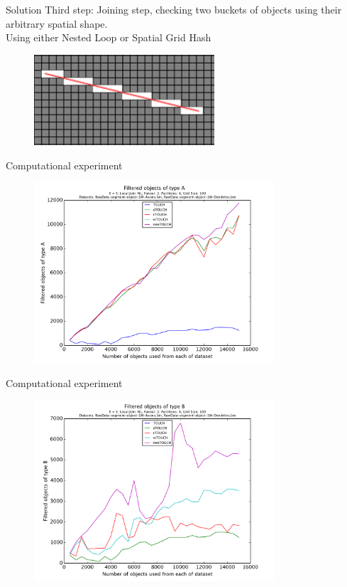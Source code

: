 \documentclass{beamer}
\begin{document}
\begin{frame}{Solution}
Third step: Joining step, checking two buckets of objects using their arbitrary spatial shape. \\
Using either Nested Loop or Spatial Grid Hash
\begin{figure}[p]
    \centering
    \includegraphics[width=0.6\textwidth]{Images/line.png}
\end{figure}
\end{frame}
\begin{frame}{Computational experiment}
\begin{figure}[p]
    \centering
    \includegraphics[width=0.8\textwidth]{Images/pic16.png}
\end{figure}
\end{frame}
\begin{frame}{Computational experiment}
\begin{figure}[p]
    \centering
    \includegraphics[width=0.8\textwidth]{Images/pic17.png}
\end{figure}
\end{frame}
\end{document}
